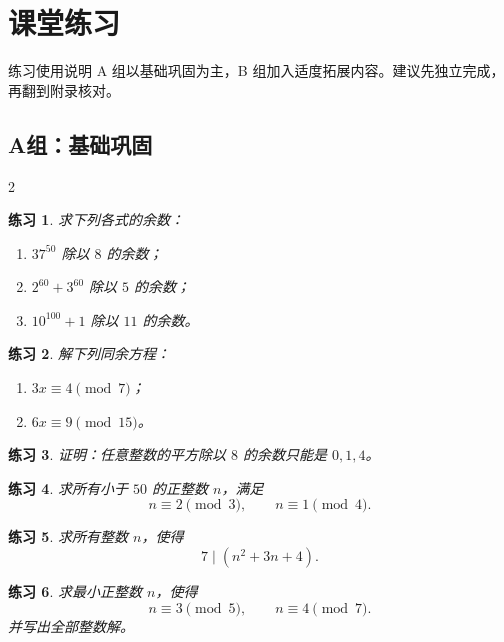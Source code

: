 \documentclass[11pt,a4paper,fontset=fandol]{ctexart}
\theoremstyle{formaltheorem}
\theoremstyle{formalexample}
\newtheorem{exercise}{练习}[section]
\newcommand{\smallblank}{\vspace{1.2cm}}
\begin{document}
\section{课堂练习}

\begin{goalbox}{练习使用说明}
A 组以基础巩固为主，B 组加入适度拓展内容。建议先独立完成，再翻到附录核对。
\end{goalbox}

\subsection{A组：基础巩固}

\begin{multicols}{2}

\begin{exercise}
求下列各式的余数：
\begin{enumerate}
  \item $37^{50}$ 除以 $8$ 的余数；
  \item $2^{60}+3^{60}$ 除以 $5$ 的余数；
  \item $10^{100}+1$ 除以 $11$ 的余数。
\end{enumerate}
\end{exercise}
\smallblank

\begin{exercise}
解下列同余方程：
\begin{enumerate}
  \item $3x\equiv 4\pmod 7$；
  \item $6x\equiv 9\pmod{15}$。
\end{enumerate}
\end{exercise}
\smallblank

\begin{exercise}
证明：任意整数的平方除以 $8$ 的余数只能是 $0,1,4$。
\end{exercise}
\smallblank

\begin{exercise}
求所有小于 $50$ 的正整数 $n$，满足
\[
n\equiv 2\pmod 3,\qquad n\equiv 1\pmod 4.
\]
\end{exercise}
\smallblank

\begin{exercise}
求所有整数 $n$，使得
\[
7\mid (n^2+3n+4).
\]
\end{exercise}
\smallblank

\begin{exercise}
求最小正整数 $n$，使得
\[
n\equiv 3\pmod 5,\qquad n\equiv 4\pmod 7.
\]
并写出全部整数解。
\end{exercise}
\smallblank


\end{multicols}
\end{document}
